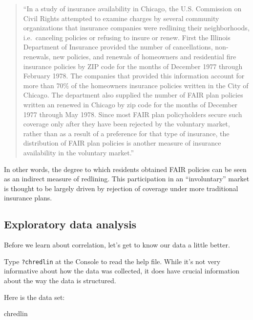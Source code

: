 \documentclass[
]{book}
\newenvironment{Shaded}{\begin{snugshade}}{\end{snugshade}}
\newcommand{\NormalTok}[1]{#1}
\begin{document}
\begin{quote}
``In a study of insurance availability in Chicago, the U.S. Commission on Civil Rights attempted to examine charges by several community organizations that insurance companies were redlining their neighborhoods, i.e.~canceling policies or refusing to insure or renew. First the Illinois Department of Insurance provided the number of cancellations, non-renewals, new policies, and renewals of homeowners and residential fire insurance policies by ZIP code for the months of December 1977 through February 1978. The companies that provided this information account for more than 70\% of the homeowners insurance policies written in the City of Chicago. The department also supplied the number of FAIR plan policies written an renewed in Chicago by zip code for the months of December 1977 through May 1978. Since most FAIR plan policyholders secure such coverage only after they have been rejected by the voluntary market, rather than as a result of a preference for that type of insurance, the distribution of FAIR plan policies is another measure of insurance availability in the voluntary market.''
\end{quote}

In other words, the degree to which residents obtained FAIR policies can be seen as an indirect measure of redlining. This participation in an ``involuntary'' market is thought to be largely driven by rejection of coverage under more traditional insurance plans.

\hypertarget{correlation-eda}{%
\subsection{Exploratory data analysis}\label{correlation-eda}}

Before we learn about correlation, let's get to know our data a little better.

Type \texttt{?chredlin} at the Console to read the help file. While it's not very informative about how the data was collected, it does have crucial information about the way the data is structured.

Here is the data set:

\begin{Shaded}
\begin{Highlighting}[]
\NormalTok{chredlin}
\end{Highlighting}
\end{Shaded}
\end{document}
